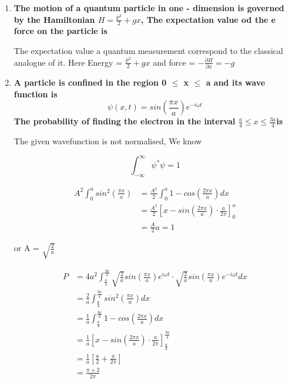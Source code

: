 \documentclass{report}
\begin{document}
\begin{enumerate}
\item \textbf{The motion of a quantum particle in one - dimension is governed by the Hamiltonian $H = \frac{p^2}{2} + gx$, The expectation value od the e force on the particle is}
\vspace{\baselineskip}

The expectation value a quantum measurement correspond to the classical analogue of it. Here Energy = $\frac{p^2}{2} + gx$ and force = $-\frac{\partial H}{\partial x} = -g$

\item \textbf{A particle is confined in the region 0 $\leq$ x  $\leq$ a and its wave function is $$\psi(x,t) = sin(\frac{\pi x}{a})e^{-i\omega t}$$ The probability of finding the electron in the interval $\frac{a}{4} \leq x \leq \frac{3a}{4} $is}
\vspace{\baselineskip}

The given wavefunction is not normalised, We know 

\begin{equation*}
        \int_{-\infty}^{\infty} \psi^* \psi = 1
\end{equation*}

\begin{equation*}
    \begin{split}
        A^2 \int_{0}^{a} sin^2(\frac{\pi x}{a}) &= \frac{A^2}{2} \int_{0}^{a} 1-cos(\frac{2\pi x}{a}) dx \\&= \frac{A^2}{2}\left[x-sin(\frac{2\pi x}{a}) \cdot \frac{a}{2\pi}\right]_{0}^{a} \\&= \frac{A}{2}a = 1
    \end{split}
\end{equation*}

or A = $\sqrt{\frac{2}{a}}$

\begin{equation*}
    \begin{split}
        P &= 4a^2\int_{\frac{a}{4}}^{\frac{3a}{4}} \sqrt{\frac{2}{a}}sin(\frac{\pi x}{a})e^{i\omega t} \cdot \sqrt{\frac{2}{a}}sin(\frac{\pi x}{a})e^{-i\omega t} dx \\&= \frac{2}{a}\int_{\frac{a}{4}}^{\frac{3a}{4}}  sin^2(\frac{\pi x}{a}) dx \\&= \frac{1}{a} \int_{\frac{a}{4}}^{\frac{3a}{4}} 1 - cos(\frac{2 \pi x}{a}) dx \\&= \frac{1}{a} \left[x-sin(\frac{2 \pi x}{a}) \cdot \frac{a}{2 \pi}\right]_{\frac{a}{4}}^{\frac{3a}{4}} \\&= \frac{1}{a}\left[\frac{a}{2}+\frac{a}{2\pi}\right] \\&= \frac{\pi + 2}{2\pi}
    \end{split}
\end{equation*}

\end{enumerate}
\end{document}

